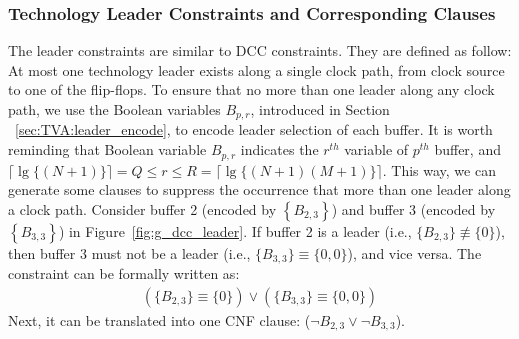 \subsubsection{Technology Leader Constraints and Corresponding Clauses}
\label{sec:TVA:dcc_c}
The leader constraints are similar to DCC constraints. They are defined as follow: At most one technology leader exists along a single clock path, from clock source to one of the flip-flops. To ensure that no more than one leader along any clock path, we use the Boolean variables $B_{p,r}$, introduced in Section ~\ref{sec:TVA:leader_encode}, to encode leader selection of each buffer. It is worth reminding that Boolean variable $B_{p,r}$ indicates the $r^{th}$ variable of $p^{th}$ buffer, and $\lceil \lg \{(N + 1)\} \rceil = Q \leq r \leq R = \lceil \lg \{(N + 1)(M + 1)\} \rceil$. This way, we can generate some clauses to suppress the occurrence that more than one leader along a clock path. Consider buffer 2 (encoded by {\fontsize{8}{8.4}$\left\{B_{2,3}\right\}$}) and buffer 3 (encoded by {\fontsize{8}{8.4}$\left\{B_{3,3}\right\}$}) in Figure~\ref{fig:g_dcc_leader}. If buffer 2 is a leader (i.e., {\fontsize{8}{8.4}$\{B_{2,3}\} \not\equiv \{0\}$}), then buffer 3 must not be a leader (i.e., {\fontsize{8}{8.4}$\{B_{3,3}\} \equiv \{0, 0\}$}), and vice versa. The constraint can be formally written as:
{
\fontsize{8}{8.4}
\begin{gather*}
\left(\{B_{2,3}\} \equiv \{0\}\right) \lor \left(\{B_{3,3}\} \equiv \{0, 0\}\right)
\end{gather*}
}
Next, it can be translated into one CNF clause:
{\fontsize{8}{8.4}($\neg B_{2,3}\lor\neg B_{3,3}$).} 

